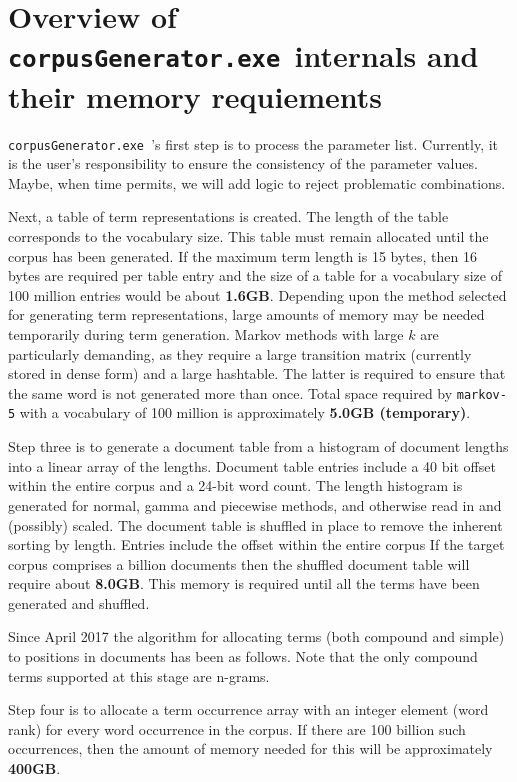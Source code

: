 \documentclass{article}
\newcommand{\gac}{\texttt{corpusGenerator.exe~}}
\begin{document}
\section{Overview of \gac internals and their memory requiements}

\gac's first step is to process the parameter list.   Currently, it
is the user's responsibility to ensure the consistency of the
parameter values.   Maybe, when time permits, we will add logic to
reject problematic combinations.

Next, a table of term representations is created.  The length of the
table corresponds to the vocabulary size.  This table must remain
allocated until the corpus has been generated.   If the maximum term
length is 15 bytes, then 16 bytes are required per table entry and 
the size of a table for a vocabulary size of 100 million entries would
be about \textbf{1.6GB}.  Depending upon the method selected for generating
term representations, large amounts of memory may be needed
temporarily during term generation.  Markov methods with large $k$ are
particularly demanding, as they require a large transition matrix
(currently stored in dense form) and a large hashtable.  The latter is
required to ensure that the same word is not generated more than once.
Total space required by \verb|markov-5| with a vocabulary of 100
million is approximately \textbf{5.0GB (temporary)}.

Step three is to generate a document table from a histogram of
document lengths into a linear array of the lengths.  Document table
entries include a 40 bit offset within the entire corpus and a 24-bit
word count.  The length histogram is generated for normal, gamma and
piecewise methods, and otherwise read in and (possibly) scaled.  The
document table is shuffled in place to remove the inherent sorting by
length.  Entries include the offset within the entire corpus If the
target corpus comprises a billion documents then the shuffled document
table will require about \textbf{8.0GB}. This memory is required until all
the terms have been generated and shuffled.

Since April 2017 the algorithm for allocating terms (both compound and
simple) to positions in documents has been as follows.  Note that the
only compound terms supported at this stage are n-grams.

Step four is to allocate a term occurrence array with an integer
element (word rank) for every word occurrence in the corpus. If there
are 100 billion such occurrences, then the amount of memory needed for
this will be approximately \textbf{400GB}.
\end{document}
